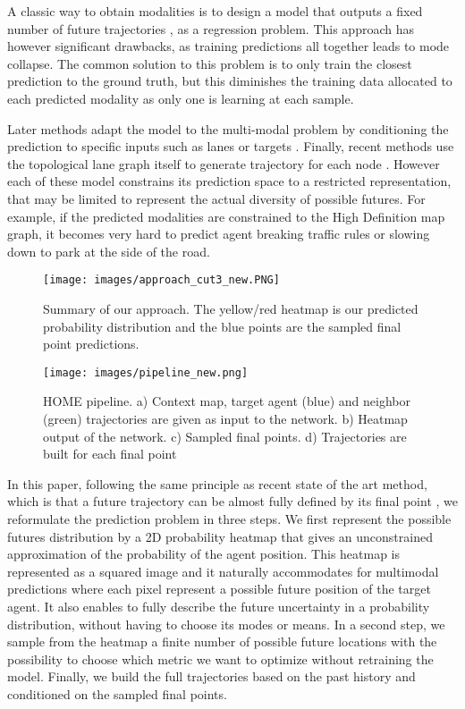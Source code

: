 \documentclass[letterpaper, 10 pt, conference]{ieeeconf}
\begin{document}
A classic way to obtain  modalities is to design a model that outputs a fixed number of  future trajectories \cite{cui2019multimodal, mercat2020multi, messaoud2020multi, liang2020learning}, as a regression problem. This approach has however significant drawbacks, as training predictions all together leads to mode collapse. The common solution to this problem is to only train the closest prediction to the ground truth, but this diminishes the training data allocated to each predicted modality as only one is learning at each sample. 

Later methods adapt the model to the multi-modal problem by conditioning the prediction to specific inputs such as lanes \cite{khandelwal2020if} or targets \cite{zhao2020tnt}. Finally, recent methods use the topological lane graph itself to generate trajectory for each node \cite{zeng2021lanercnn}. However each of these model constrains its prediction space to a restricted representation, that may be limited to represent the actual diversity of possible futures. For example, if the predicted modalities are constrained to the High Definition map graph, it becomes very hard to predict agent breaking traffic rules or slowing down to park at the side of the road.

\begin{figure}[t]
\centerline{\texttt{[image: images/approach\_cut3\_new.PNG]}}
\caption{Summary of our approach. The yellow/red heatmap is our predicted probability distribution and the blue points are the sampled final point predictions. }
\label{fig:approach}
\end{figure}

\begin{figure*}[t]
\centerline{\texttt{[image: images/pipeline\_new.png]}}
\caption{HOME pipeline. a) Context map, target agent (blue) and neighbor (green) trajectories are given as input to the network. b) Heatmap output of the network. c) Sampled final points. d) Trajectories are built for each final point}
\label{fig:pipeline}
\end{figure*}

In this paper, following the same principle as recent state of the art method, which is that a future trajectory can be almost fully defined by its final point \cite{zhao2020tnt, zeng2021lanercnn}, we reformulate the prediction problem in three steps. We first represent the possible futures distribution by a 2D probability heatmap that gives an unconstrained approximation of the probability of the agent position. This heatmap is represented as a squared image and it naturally accommodates for multimodal predictions where each pixel represent a possible future position of the target agent. It also enables to fully describe the future uncertainty in a probability distribution, without having to choose its modes or means. In a second step, we sample from the heatmap a finite number of possible future locations with the possibility to choose which metric we want to optimize without retraining the model. Finally, we build the full trajectories based on the past history and conditioned on the sampled final points.
\end{document}
